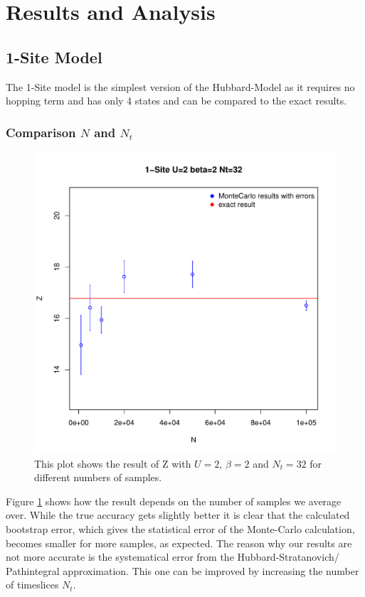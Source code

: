 
\section{Results and Analysis}
\subsection{1-Site Model}
The 1-Site model is the simplest version of the Hubbard-Model as it requires no hopping term and has only 4 states and can be compared to the exact results.
\subsubsection{Comparison $N$ and $N_t$}
\begin{figure}[H]
	\centering
	\includegraphics[width=0.7\linewidth]{figs/plot_Z1N}
	\caption[Scaling of Z with N]{This plot shows the result of Z with $U=2$, $\beta=2$ and $N_t=32$ for different numbers of samples.}
	\label{fig:plotz1n}
\end{figure}
Figure \ref{fig:plotz1n} shows how the result depends on the number of samples we average over. While the true accuracy gets slightly better it is clear that the calculated bootstrap error, which gives the statistical error of the Monte-Carlo calculation, becomes smaller for more samples, as expected. The reason why our results are not more accurate is the systematical error from the Hubbard-Stratanovich/ Pathintegral approximation. This one can be improved by increasing the number of timeslices $N_t$.
